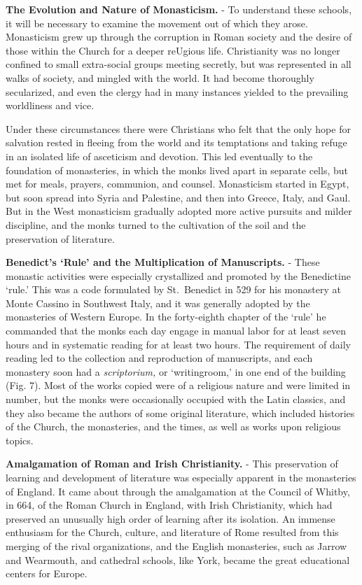 \documentclass[]{book}
\begin{document}
\textbf{The Evolution and Nature of Monasticism.} - To understand these schools, it will be necessary to examine the movement out of which they arose. Monasticism grew up through the corruption in Roman society and the desire of those within the Church for a deeper reUgious life. Christianity was no longer confined to small extra-social groups meeting secretly, but was represented in all walks of society, and mingled with the world. It had become thoroughly secularized, and even the clergy had in many instances yielded to the prevailing worldliness and vice.

Under these circumstances there were Christians who felt that the only hope for salvation rested in fleeing from the world and its temptations and taking refuge in an isolated life of asceticism and devotion. This led eventually to the foundation of monasteries, in which the monks lived apart in separate cells, but met for meals, prayers, communion, and counsel. Monasticism started in Egypt, but soon spread into Syria and Palestine, and then into Greece, Italy, and Gaul. But in the West monasticism gradually adopted more active pursuits and milder discipline, and the monks turned to the cultivation of the soil and the preservation of literature.

\textbf{Benedict's `Rule' and the Multiplication of Manuscripts.} - These monastic activities were especially crystallized and promoted by the Benedictine `rule.' This was a code formulated by St.~Benedict in 529 for his monastery at Monte Cassino in Southwest Italy, and it was generally adopted by the monasteries of Western Europe. In the forty-eighth chapter of the `rule' he commanded that the monks each day engage in manual labor for at least seven hours and in systematic reading for at least two hours. The requirement of daily reading led to the collection and reproduction of manuscripts, and each monastery soon had a \emph{scriptorium,} or `writingroom,' in one end of the building (Fig. 7). Most of the works copied were of a religious nature and were limited in number, but the monks were occasionally occupied with the Latin classics, and they also became the authors of some original literature, which included histories of the Church, the monasteries, and the times, as well as works upon religious topics.

\textbf{Amalgamation of Roman and Irish Christianity.} - This preservation of learning and development of literature was especially apparent in the monasteries of England. It came about through the amalgamation at the Council of Whitby, in 664, of the Roman Church in England, with Irish Christianity, which had preserved an unusually high order of learning after its isolation. An immense enthusiasm for the Church, culture, and literature of Rome resulted from this merging of the rival organizations, and the English monasteries, such as Jarrow and Wearmouth, and cathedral schools, like York, became the great educational centers for Europe.
\end{document}
